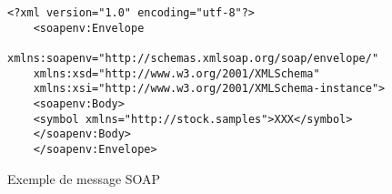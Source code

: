 \begin{figure}[h]
    \begin{Verbatim}[frame=single, fontsize=\small]
	<?xml version="1.0" encoding="utf-8"?>
	<soapenv:Envelope
	xmlns:soapenv="http://schemas.xmlsoap.org/soap/envelope/"
	xmlns:xsd="http://www.w3.org/2001/XMLSchema"
	xmlns:xsi="http://www.w3.org/2001/XMLSchema-instance">
	<soapenv:Body>
	<symbol xmlns="http://stock.samples">XXX</symbol>
	</soapenv:Body>
	</soapenv:Envelope>
    \end{Verbatim}
    \caption{Exemple de message SOAP}
    \label{fig:soap-message-example}
\end{figure}
